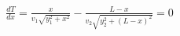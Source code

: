 \documentclass[preview]{standalone}
\begin{document}
\begin{align*}
\frac{dT}{dx} = \frac{x}{v_1\sqrt{y_1^2 + x^2}} - \frac{L-x}{v_2\sqrt{y_2^2 + (L-x)^2}} = 0
\end{align*}
\end{document}
